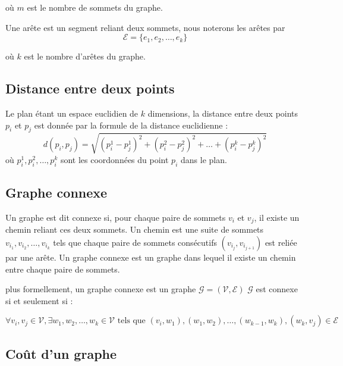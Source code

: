 \documentclass[12pt,a4paper]{article}
\begin{document}
où \( m \) est le nombre de sommets du graphe.

Une arête est un segment reliant deux sommets,
nous noterons les arêtes par
\begin{equation*}
    \mathcal{E}  = \{ e_1, e_2, \ldots, e_k \}
\end{equation*}

où \( k \) est le nombre d'arêtes du graphe.


\subsection{Distance entre deux points}

Le plan étant un espace euclidien de $k$ dimensions,
la distance entre deux points \( p_i \) et \( p_j \) est donnée par la formule de la distance euclidienne :
\begin{equation*}
    d(p_i, p_j) = \sqrt{(p_i^1 - p_j^1)^2 + (p_i^2 - p_j^2)^2 + \ldots + (p_i^k - p_j^k)^2}
\end{equation*}
où \( p_i^1, p_i^2, \ldots, p_i^k \) sont les coordonnées du point \( p_i \) dans le plan.

\subsection{Graphe connexe}

Un graphe est dit connexe si, pour chaque paire de sommets \( v_i \) et \( v_j \), il existe un chemin reliant ces deux sommets.
Un chemin est une suite de sommets \( v_{i_1}, v_{i_2}, \ldots, v_{i_k} \) tels que chaque paire de sommets consécutifs \( (v_{i_j}, v_{i_{j+1}}) \) est reliée par une arête.
Un graphe connexe est un graphe dans lequel il existe un chemin entre chaque paire de sommets.

plus formellement, un graphe connexe est un graphe \( \mathcal{G} = (\mathcal{V}, \mathcal{E}) \) 
$\mathcal{G}$ est connexe si et seulement si :

\begin{equation*}
    \forall v_i, v_j \in \mathcal{V}, \exists w_1, w_2, \ldots, w_k \in \mathcal{V} \text{ tels que } (v_i, w_1), (w_1, w_2), \ldots, (w_{k-1}, w_k), (w_k, v_j) \in \mathcal{E}
\end{equation*}

\subsection{Coût d'un graphe}
\end{document}
